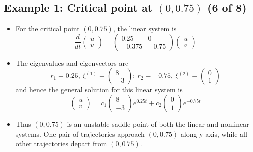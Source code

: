 \documentclass[11pt,a4paper]{article}
\begin{document}
	\subsection*{Example 1: Critical point at $(0,0.75)$ (6 of 8)}
	\begin{itemize}
		\item For the critical point $(0,0.75)$, the linear system is
		$$
		\frac{d}{dt} 
		\begin{pmatrix}
			u\\
			v
		\end{pmatrix} =
		\begin{pmatrix}
			0.25 & 0\\
			-0.375 & -0.75
		\end{pmatrix}
		\begin{pmatrix}
			u\\
			v
		\end{pmatrix}
		$$
		\item The eigenvalues and eigenvectors are
		$$
		r_1 = 0.25,\ \xi^{(1)} =
		\begin{pmatrix}
			8\\
			-3
		\end{pmatrix};\ r_2 = -0.75,\ \xi^{(2)}=
		\begin{pmatrix}
			0\\
			1
		\end{pmatrix}
		$$
		and hence the general solution for this linear system is
		$$
		\begin{pmatrix}
			u\\
			v
		\end{pmatrix} = c_1
		\begin{pmatrix}
			8\\
			-3
		\end{pmatrix}e^{0.25t} + c_2
		\begin{pmatrix}
			0\\
			1
		\end{pmatrix}e^{-0.75t}
		$$
		\item Thus $(0,0.75)$ is an unstable saddle point of both the linear and nonlinear systems. One pair of trajectories approach $(0,0.75)$ along y-axis, while all other trajectories depart from $(0,0.75)$.
	\end{itemize}
\end{document}
